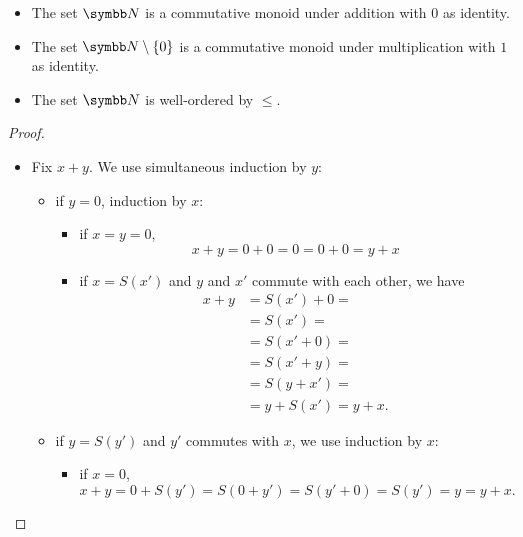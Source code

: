 \begin{proposition}\label{def:natural_numbers}
  \begin{itemize}\mbox{}
    \item The set \( \N \) is a commutative monoid under addition with \( 0 \) as identity.
    \item The set \( \N \setminus \{ 0 \} \) is a commutative monoid under multiplication with \( 1 \) as identity.
    \item The set \( \N \) is well-ordered by \( \leq \).
  \end{itemize}
\end{proposition}
\begin{proof}
  \begin{itemize}\mbox{}
    \item Fix \( x + y \). We use simultaneous induction by \( y \):
    \begin{itemize}
      \item if \( y = 0 \), induction by \( x \):
      \begin{itemize}
        \item if \( x = y = 0 \),
        \begin{equation*}
          x + y = 0 + 0 = 0 = 0 + 0 = y + x
        \end{equation*}

        \item if \( x = S(x') \) and \( y \) and \( x' \) commute with each other, we have
        \begin{align*}
          x + y
          &=
          S(x') + 0
          = \\ &=
          S(x')
          = \\ &=
          S(x' + 0)
          = \\ &=
          S(x' + y)
          = \\ &=
          S(y + x')
          = \\ &=
          y + S(x')
          =
          y + x.
        \end{align*}
      \end{itemize}

      \item if \( y = S(y') \) and \( y' \) commutes with \( x \), we use induction by \( x \):
      \begin{itemize}
        \item if \( x = 0 \),
        \begin{equation*}
          x + y = 0 + S(y') = S(0 + y') = S(y' + 0) = S(y') = y = y + x.
        \end{equation*}


\end{itemize}
\end{itemize}
\end{itemize}
\end{proof}
